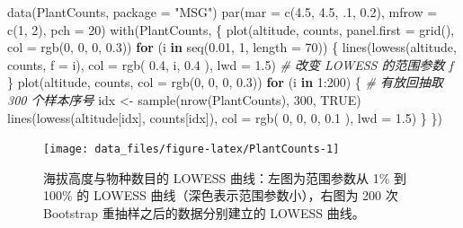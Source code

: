 \documentclass[
  b5paper,
  UTF8,twoside]{book}
\newenvironment{Shaded}{\begin{snugshade}}{\end{snugshade}}
\newcommand{\AttributeTok}[1]{\textcolor[rgb]{0.77,0.63,0.00}{#1}}
\newcommand{\CommentTok}[1]{\textcolor[rgb]{0.56,0.35,0.01}{\textit{#1}}}
\newcommand{\ConstantTok}[1]{\textcolor[rgb]{0.00,0.00,0.00}{#1}}
\newcommand{\ControlFlowTok}[1]{\textcolor[rgb]{0.13,0.29,0.53}{\textbf{#1}}}
\newcommand{\DecValTok}[1]{\textcolor[rgb]{0.00,0.00,0.81}{#1}}
\newcommand{\FloatTok}[1]{\textcolor[rgb]{0.00,0.00,0.81}{#1}}
\newcommand{\FunctionTok}[1]{\textcolor[rgb]{0.00,0.00,0.00}{#1}}
\newcommand{\NormalTok}[1]{#1}
\newcommand{\OtherTok}[1]{\textcolor[rgb]{0.56,0.35,0.01}{#1}}
\newcommand{\SpecialCharTok}[1]{\textcolor[rgb]{0.00,0.00,0.00}{#1}}
\newcommand{\StringTok}[1]{\textcolor[rgb]{0.31,0.60,0.02}{#1}}
\begin{document}
\begin{Shaded}
\begin{Highlighting}[]
\FunctionTok{data}\NormalTok{(PlantCounts, }\AttributeTok{package =} \StringTok{"MSG"}\NormalTok{)}
\FunctionTok{par}\NormalTok{(}\AttributeTok{mar =} \FunctionTok{c}\NormalTok{(}\FloatTok{4.5}\NormalTok{, }\FloatTok{4.5}\NormalTok{, .}\DecValTok{1}\NormalTok{, }\FloatTok{0.2}\NormalTok{), }\AttributeTok{mfrow =} \FunctionTok{c}\NormalTok{(}\DecValTok{1}\NormalTok{, }\DecValTok{2}\NormalTok{), }\AttributeTok{pch =} \DecValTok{20}\NormalTok{)}
\FunctionTok{with}\NormalTok{(PlantCounts, \{}
  \FunctionTok{plot}\NormalTok{(altitude, counts, }\AttributeTok{panel.first =} \FunctionTok{grid}\NormalTok{(), }\AttributeTok{col =} \FunctionTok{rgb}\NormalTok{(}\DecValTok{0}\NormalTok{, }\DecValTok{0}\NormalTok{, }\DecValTok{0}\NormalTok{, }\FloatTok{0.3}\NormalTok{))}
  \ControlFlowTok{for}\NormalTok{ (i }\ControlFlowTok{in} \FunctionTok{seq}\NormalTok{(}\FloatTok{0.01}\NormalTok{, }\DecValTok{1}\NormalTok{, }\AttributeTok{length =} \DecValTok{70}\NormalTok{)) \{}
    \FunctionTok{lines}\NormalTok{(}\FunctionTok{lowess}\NormalTok{(altitude, counts, }\AttributeTok{f =}\NormalTok{ i), }\AttributeTok{col =} \FunctionTok{rgb}\NormalTok{(}
      \FloatTok{0.4}\NormalTok{,}
\NormalTok{      i, }\FloatTok{0.4}
\NormalTok{    ), }\AttributeTok{lwd =} \FloatTok{1.5}\NormalTok{) }\CommentTok{\# 改变 LOWESS 的范围参数 f}
\NormalTok{  \}}
  \FunctionTok{plot}\NormalTok{(altitude, counts, }\AttributeTok{col =} \FunctionTok{rgb}\NormalTok{(}\DecValTok{0}\NormalTok{, }\DecValTok{0}\NormalTok{, }\DecValTok{0}\NormalTok{, }\FloatTok{0.3}\NormalTok{))}
  \ControlFlowTok{for}\NormalTok{ (i }\ControlFlowTok{in} \DecValTok{1}\SpecialCharTok{:}\DecValTok{200}\NormalTok{) \{}
    \CommentTok{\# 有放回抽取 300 个样本序号}
\NormalTok{    idx }\OtherTok{\textless{}{-}} \FunctionTok{sample}\NormalTok{(}\FunctionTok{nrow}\NormalTok{(PlantCounts), }\DecValTok{300}\NormalTok{, }\ConstantTok{TRUE}\NormalTok{)}
    \FunctionTok{lines}\NormalTok{(}\FunctionTok{lowess}\NormalTok{(altitude[idx], counts[idx]), }\AttributeTok{col =} \FunctionTok{rgb}\NormalTok{(}
      \DecValTok{0}\NormalTok{,}
      \DecValTok{0}\NormalTok{, }\DecValTok{0}\NormalTok{, }\FloatTok{0.1}
\NormalTok{    ), }\AttributeTok{lwd =} \FloatTok{1.5}\NormalTok{)}
\NormalTok{  \}}
\NormalTok{\})}
\end{Highlighting}
\end{Shaded}

\begin{figure}

{\centering \texttt{[image: data\_files/figure-latex/PlantCounts-1]} 

}

\caption[海拔高度与物种数目的 LOWESS 曲线]{海拔高度与物种数目的 LOWESS 曲线：左图为范围参数从 1\% 到 100\% 的 LOWESS 曲线（深色表示范围参数小），右图为 200 次 Bootstrap 重抽样之后的数据分别建立的 LOWESS 曲线。}\label{fig:PlantCounts}
\end{figure}
\end{document}
